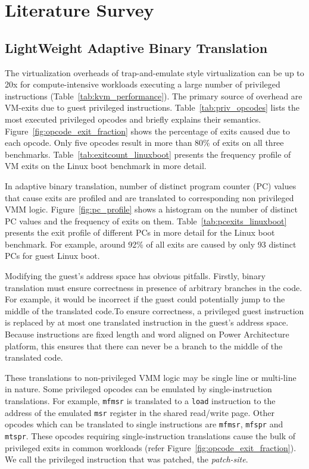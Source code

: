 \chapter{Literature Survey}\label{ch:2}
\section{LightWeight Adaptive Binary Translation}
\label{adaptive_binary_translation}
The virtualization overheads of trap-and-emulate style virtualization can be up to 20x for compute-intensive workloads executing a large number of privileged instructions (Table~\ref{tab:kvm_performance}). The primary source of overhead are VM-exits due to guest privileged instructions. Table~\ref{tab:priv_opcodes} lists the most executed privileged opcodes and briefly explains their semantics. Figure~\ref{fig:opcode_exit_fraction} shows the percentage of exits caused due to each opcode. Only five opcodes result in more than 80\% of exits on all three benchmarks. Table~\ref{tab:exitcount_linuxboot} presents the frequency profile of VM exits on the Linux boot benchmark in more detail.

In adaptive binary translation, number of distinct program counter (PC) values that cause exits are profiled and are translated to corresponding non privileged VMM logic. Figure~\ref{fig:pc_profile} shows a histogram on the number of distinct PC values and the frequency of exits on them. Table~\ref{tab:pcexits_linuxboot} presents the exit profile of different PCs in more detail for the Linux boot benchmark. For example, around 92\% of all exits are caused by only 93 distinct PCs for guest Linux boot.

Modifying the guest's address space has obvious pitfalls. Firstly, binary translation must ensure correctness in presence of arbitrary branches in the code. For example, it would be incorrect if the guest could potentially jump to the middle of the translated code.To ensure correctness, a privileged guest instruction is replaced by at most one translated instruction in the guest's address space. Because instructions are fixed length and word aligned on Power Architecture platform, this ensures that there can never be a branch to the middle of the translated code.

These translations to non-privileged VMM logic may be single line  or multi-line in nature. Some privileged opcodes can be emulated by single-instruction translations. For example, {\tt mfmsr} is translated to a {\tt load} instruction to the address of the emulated {\tt msr} register in the shared read/write page. Other opcodes which can be translated to single instructions are {\tt mfmsr}, {\tt mfspr} and {\tt mtspr}. These opcodes requiring single-instruction translations cause the bulk of privileged exits in common workloads (refer Figure~\ref {fig:opcode_exit_fraction}). We call the privileged instruction that was patched, the {\em patch-site}.

